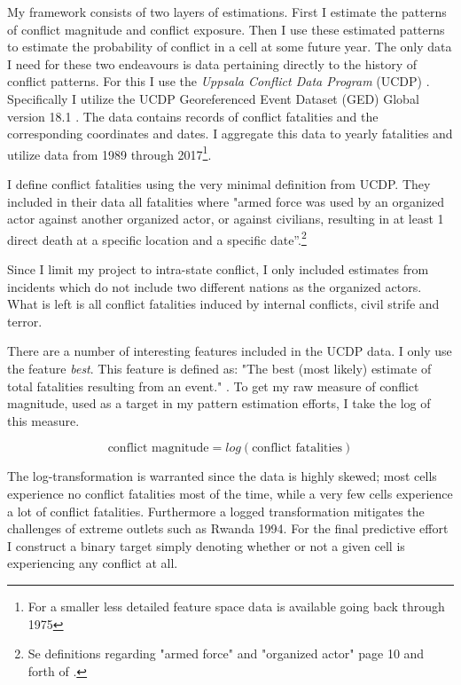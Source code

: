 \documentclass[a4paper]{article}
\begin{document}
My framework consists of two layers of estimations. First I estimate the patterns of conflict magnitude and conflict exposure. Then I use these estimated patterns to estimate the probability of conflict in a cell at some future year. The only data I need for these two endeavours is data pertaining directly to the history of conflict patterns. For this I use the \emph{Uppsala Conflict Data Program} (UCDP) \citep{Sundberg_2013, Croicu_Sundberg_2017}. Specifically I utilize the UCDP Georeferenced Event Dataset (GED) Global version 18.1 \citep{UCDP_2017}. The data contains records of conflict fatalities and the corresponding coordinates and dates. I aggregate this data to yearly fatalities and utilize data from 1989 through 2017\footnote{For a smaller less detailed feature space data is available going back through 1975}.\par 

I define conflict fatalities using the very minimal definition from UCDP. They included in their data all fatalities where "armed force was used by an organized actor against another organized actor, or against civilians, resulting in at least 1 direct death at a specific location and a specific date”.\cite[9]{Croicu_Sundberg_2017}\footnote{Se definitions regarding "armed force" and "organized actor" page 10 and forth of \cite{Croicu_Sundberg_2017}.}\par 

Since I limit my project to intra-state conflict, I only included estimates from incidents which do not include two different nations as the organized actors. What is left is all conflict fatalities induced by internal conflicts, civil strife and terror.\par

There are a number of interesting features included in the UCDP data. I only use the feature \emph{best}. This feature is defined as: "The best (most likely) estimate of total fatalities resulting from an event." \cite[7]{Croicu_Sundberg_2017}. To get my raw measure of conflict magnitude, used as a target in my pattern estimation efforts, I take the log of this measure.\par

\[
\text{conflict magnitude} = log(\text{conflict fatalities}) \tag{18} \label{eq:cm}
\]

The log-transformation is warranted since the data is highly skewed; most cells experience no conflict fatalities most of the time, while a very few cells experience a lot of conflict fatalities. Furthermore a logged transformation mitigates the challenges of extreme outlets such as Rwanda 1994. For the final predictive effort I construct a binary target simply denoting whether or not a given cell is experiencing any conflict at all.\par
\end{document}
